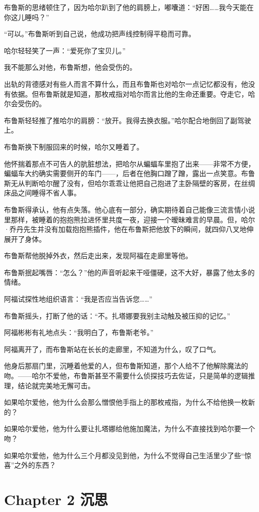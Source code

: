 \documentclass[../main.tex]{subfiles}
\begin{document}
布鲁斯的思绪顿住了，因为哈尔趴到了他的肩膀上，嘟囔道：“好困……我今天能在你这儿睡吗？”

“可以。”布鲁斯听到自己说，他成功把声线控制得平稳而可靠。

哈尔轻轻笑了一声：“爱死你了宝贝儿。”

我不能那么对他，布鲁斯想，他会受伤的。

出轨的背德感对有些人而言不算什么，而且布鲁斯也对哈尔一点记忆都没有，他没有依据。但布鲁斯就是知道，那枚戒指对哈尔而言比他的生命还重要。夺走它，哈尔会受伤的。

布鲁斯轻轻推了推哈尔的肩膀：“放开。我得去换衣服。”哈尔配合地倒回了副驾驶上。

布鲁斯换下制服回来的时候，哈尔又睡着了。

他怀揣着那点不可告人的肮脏想法，把哈尔从蝙蝠车里抱了出来——非常不方便，蝙蝠车大约确实需要侧开的车门——，后者在他胸口蹭了蹭，露出一点笑意。布鲁斯无从判断哈尔醒了没有，但哈尔乖乖让他把自己抱进了主卧隔壁的客房，在丝绸床品之间睡得不省人事。

布鲁斯得承认，他有点失落。他心底有一部分，确实期待着自己能像三流言情小说里那样，被睡着的抱抱熊拉进怀里共度一夜，迎接一个暧昧难言的早晨。但，哈尔·乔丹先生并没有加载抱抱熊插件，他在布鲁斯把他放下的瞬间，就四仰八叉地伸展开了身体。

布鲁斯帮他脱掉外衣，然后走出来，发现阿福在走廊里等他。

布鲁斯抿起嘴唇：“怎么？”他的声音听起来干哑僵硬，这不大好，暴露了他太多的情绪。

阿福试探性地组织语言：“我是否应当告诉您……”

布鲁斯摇头，打断了他的话：“不。扎塔娜要我别主动触及被压抑的记忆。”

阿福彬彬有礼地点头：“我明白了，布鲁斯老爷。”

阿福离开了，而布鲁斯站在长长的走廊里，不知道为什么，叹了口气。

他身后那扇门里，沉睡着他爱的人，但布鲁斯知道，那个人给不了他解除魔法的吻。——哈尔不爱他，布鲁斯甚至不需要什么侦探技巧去佐证，只是简单的逻辑推理，结论就完美地无懈可击。

如果哈尔爱他，他为什么会那么憎恨他手指上的那枚戒指，为什么不给他换一枚新的？

如果哈尔爱他，他为什么要让扎塔娜给他施加魔法，为什么不直接找到哈尔要一个吻？

如果哈尔爱他，他为什么三个月都没见到他，为什么不觉得自己生活里少了些“惊喜”之外的东西？

\section*{Chapter 2\hspace{1em} 沉思}
\end{document}
